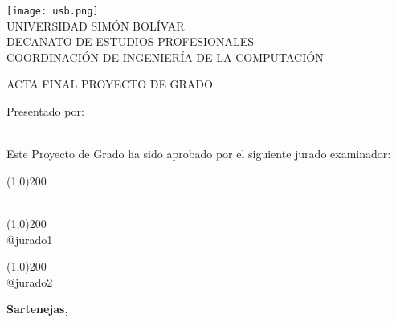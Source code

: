 \begin{titlepage}
\begin{center}

\texttt{[image: usb.png]} \\

\textsc {\large UNIVERSIDAD SIMÓN BOLÍVAR} \\
\textsc{DECANATO DE ESTUDIOS PROFESIONALES\\
COORDINACIÓN DE INGENIERÍA DE LA COMPUTACIÓN}

\bigskip
\bigskip
\bigskip
\bigskip
\bigskip
\bigskip

\textsc{ACTA FINAL PROYECTO DE GRADO}

\bigskip
\bigskip

\textsc{\textbf{\projectTitle}}

\bigskip
\bigskip
\bigskip
\bigskip

\begin{minipage}{\textwidth}
\centering
Presentado por: \\
\textsc{\textbf{\authorName}} \\

\bigskip
\bigskip
\bigskip

Este Proyecto de Grado ha sido aprobado por el siguiente jurado examinador: \\

\bigskip
\bigskip

\newcommand{\juryinfo}[1]{
\line(1,0){200} \\
#1 \\

\bigskip
\bigskip
}

\juryinfo{\tutorName}
\juryinfo{@jurado1}
\juryinfo{@jurado2}

\let\juryinfo\undefined

\end{minipage}
\vfill

{\large \bfseries Sartenejas, }

\end{center}
\end{titlepage}
